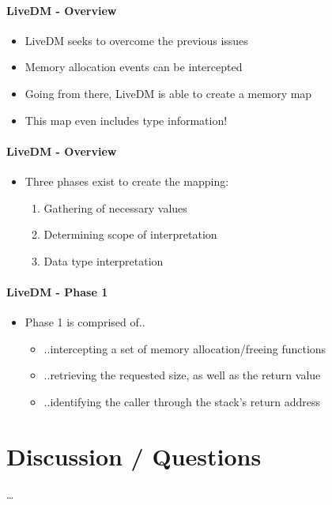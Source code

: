 \documentclass{i20lecture}
\begin{document}
\begin{frame}{\insertsection}
  \framesubtitle{LiveDM - Overview}
  
  \begin{itemize}
    \item LiveDM seeks to overcome the previous issues
\pause
    \item Memory allocation events can be intercepted
\pause
    \item Going from there, LiveDM is able to create a memory map
\pause
    \item This map even includes type information!
  \end{itemize}
\end{frame}

\begin{frame}{\insertsection}
  \framesubtitle{LiveDM - Overview}
  
  \begin{itemize}
    \item Three phases exist to create the mapping:
    \begin{enumerate}
\pause
     \item Gathering of necessary values
\pause
     \item Determining scope of interpretation
\pause
     \item Data type interpretation
    \end{enumerate}
  \end{itemize}
\end{frame}

\begin{frame}{\insertsection}
  \framesubtitle{LiveDM - Phase 1}
  
  \begin{itemize}
    \item Phase 1 is comprised of..
    \begin{itemize}
\pause
     \item ..intercepting a set of memory allocation/freeing functions
\pause
     \item ..retrieving the requested size, as well as the return value
\pause
     \item ..identifying the caller through the stack's return address
    \end{itemize}
  \end{itemize}
\end{frame}



\section{Discussion / Questions}
\begin{frame}{\insertsection}
  \begin{center}
    \LARGE \dots
  \end{center}
\end{frame}
\end{document}
